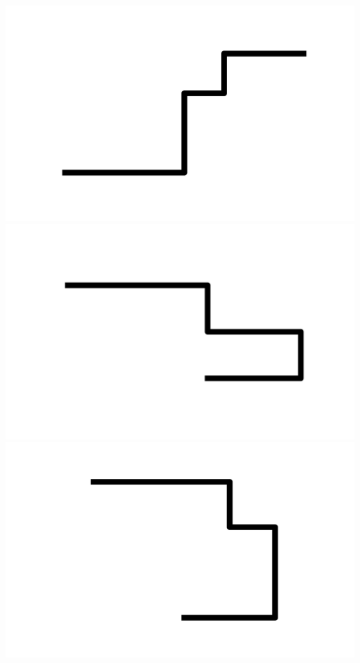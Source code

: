 \documentclass[]{report}
\begin{document}
\includegraphics[scale=.1]{pictures/21/state_cluster_shapes_283.pdf} 
\includegraphics[scale=.1]{pictures/21/state_cluster_shapes_284.pdf} 
\includegraphics[scale=.1]{pictures/21/state_cluster_shapes_285.pdf} 
\end{document}
